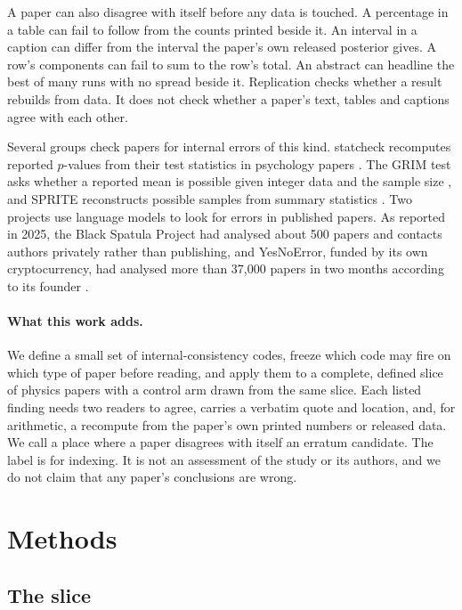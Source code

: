 \documentclass[reprint,amsmath,amssymb,aps,superscriptaddress,nofootinbib]{revtex4-2}
\begin{document}
A paper can also disagree with itself before any data is touched. A percentage in a table can fail to follow from the counts printed beside it. An interval in a caption can differ from the interval the paper's own released posterior gives. A row's components can fail to sum to the row's total. An abstract can headline the best of many runs with no spread beside it. Replication checks whether a result rebuilds from data. It does not check whether a paper's text, tables and captions agree with each other.

Several groups check papers for internal errors of this kind. statcheck recomputes reported $p$-values from their test statistics in psychology papers \cite{Nuijten2016}. The GRIM test asks whether a reported mean is possible given integer data and the sample size \cite{BrownHeathers2017}, and SPRITE reconstructs possible samples from summary statistics \cite{Heathers2018}. Two projects use language models to look for errors in published papers. As reported in 2025, the Black Spatula Project had analysed about 500 papers and contacts authors privately rather than publishing, and YesNoError, funded by its own cryptocurrency, had analysed more than 37,000 papers in two months according to its founder \cite{Gibney2025}.

\paragraph*{What this work adds.} We define a small set of internal-consistency codes, freeze which code may fire on which type of paper before reading, and apply them to a complete, defined slice of physics papers with a control arm drawn from the same slice. Each listed finding needs two readers to agree, carries a verbatim quote and location, and, for arithmetic, a recompute from the paper's own printed numbers or released data. We call a place where a paper disagrees with itself an erratum candidate. The label is for indexing. It is not an assessment of the study or its authors, and we do not claim that any paper's conclusions are wrong.

\section{Methods}

\subsection{The slice}
\end{document}
